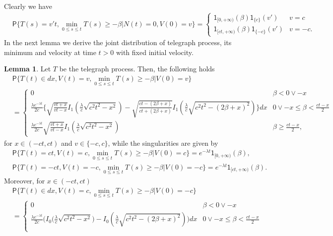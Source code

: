 \documentclass{article}
\theoremstyle{definition}
\newtheorem{lemma}{Lemma}[section]
\numberwithin{equation}{section}
\begin{document}
Clearly we have
\begin{align}
&\mathsf{P}\{T(s) = v't,\min_{0\leq s \leq t}T(s)\geq -\beta|N(t) = 0,V(0) = v\} =\begin{cases}
\mathsf{1}_{[0,+\infty)}(\beta)\mathsf{1}_{\{c\}}(v') &v=c\\
\mathsf{1}_{[ct,+\infty)}(\beta)\mathsf{1}_{\{-c\}}(v') &v=-c.
\end{cases}
\end{align}
In the next lemma we derive the joint distribution of telegraph process, its minimum and velocity at time $t>0$ with fixed initial velocity.
\begin{lemma}\label{lemma joint distribution telegraph minimum with velocity}
Let $T$ be the telegraph process. Then, the following holds
\begin{align}\label{joint telegraph velocity minimum 1}
&\mathsf{P}\{T(t) \in dx,V(t) = v,\min_{0\leq s \leq t}T(s) \geq -\beta|V(0) = v\} \\
&=\begin{cases}
0 &\beta<0\lor -x\\
\frac{\lambda e^{-\lambda t}}{2c}\Big\{\sqrt{\frac{vt+x}{vt-x}}I_1(\frac{\lambda}{c}\sqrt{c^2t^2-x^2})-\sqrt{\frac{ct-(2\beta+x)}{ct+(2\beta+x)}}I_1(\frac{\lambda}{c}\sqrt{c^2t^2-(2\beta+x)^2})\Big\}dx &0\lor -x\leq \beta <\frac{ct-x}{2}\\
\frac{\lambda e^{-\lambda t}}{2c}\sqrt{\frac{vt+x}{vt-x}}I_1(\frac{\lambda}{c}\sqrt{c^2t^2-x^2}) & \beta\geq \frac{ct-x}{2}, \nonumber
\end{cases}
\end{align}
for $x \in (-ct,ct)$ and $v \in\{-c,c\}$, while the singularities are given by
\begin{align}
&\mathsf{P}\{T(t) = ct,V(t) = c,\min_{0\leq s \leq t}T(s) \geq -\beta|V(0) = c\} = e^{-\lambda t}\mathsf{1}_{[0,+\infty)}(\beta),\label{joint telegraph minimum 4} \\
&\mathsf{P}\{T(t) = -ct,V(t) = -c,\min_{0\leq s \leq t}T(s) \geq -\beta|V(0) = -c\} = e^{-\lambda t}\mathsf{1}_{[ct,+\infty)}(\beta)\label{joint telegraph minimum 5}.
\end{align}
Moreover, for $x \in (-ct,ct)$
\begin{align}
&\mathsf{P}\{T(t) \in dx,V(t) = c,\min_{0\leq s \leq t}T(s) \geq -\beta|V(0) = -c\} \label{joint telegraph velocity minimum 2} \\
&=\begin{cases}
0 &\beta<0\lor -x\\
\frac{\lambda e^{-\lambda t}}{2c}\big(I_0\big(\frac{\lambda}{c}\sqrt{c^2t^2-x^2}\big)-I_0(\frac{\lambda}{c}\sqrt{c^2t^2-(2\beta+x)^2})\big)dx & 0\lor -x\leq \beta <\frac{ct-x}{2}\\

\end{cases}
\end{align}
\end{lemma}
\end{document}
